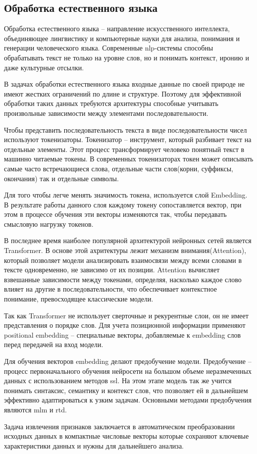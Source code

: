 \documentclass[../part_1.tex]{subfiles}
\begin{document}
\subsection{Обработка естественного языка}
\par Обработка естественного языка -- направление искусственного интеллекта, объединяющее лингвистику и компьютерные науки для анализа, понимания и генерации человеческого языка. Современные \acrshort{nlp}-системы способны обрабатывать текст не только на уровне слов, но и понимать контекст, иронию и даже культурные отсылки.
\par В задачах обработки естественного языка входные данные по своей природе не имеют жестких ограничений по длине и структуре. Поэтому для эффективной обработки таких данных требуются архитектуры способные учитывать произвольные зависимости между элементами последовательности. 
\par Чтобы представить последовательность текста в виде последовательности чисел используют токенизаторы. Токенизатор -- инструмент, который разбивает текст на отдельные элементы. Этот процесс трансформирует человеко понятный текст в машинно читаемые токены. В современных токенизаторах токен может описывать самые часто встречающиеся слова, отдельные части слов(корни, суффиксы, окончания) так и отдельные символы. 
\par Для того чтобы легче менять значимость токена, используется слой Embedding. В результате работы данного слоя каждому токену сопоставляется вектор, при этом в процессе обучения эти векторы изменяются так, чтобы передавать смысловую нагрузку токенов.
\par В последнее время наиболее популярной архитектурой нейронных сетей является Transformer. В основе этой ахритектуры лежит механизм внимания(Attention), который позволяет модели анализировать взаимосвязи между всеми словами в тексте одновременно, не зависимо от их позиции. Attention вычисляет взвешанные зависимости между токенами, определяя, насколько каждое слово влияет на другие в последовательности, что обеспечивает контекстное понимание, превосходящее классические модели.
\par Так как Transformer не использует сверточные и рекурентные слои, он не имеет представления о порядке слов. Для учета позиционной информации применяют positional embedding -- специальные векторы, добавляемые к embedding слов перед передачей на вход модели.
\par Для обучения векторов embedding делают предобучение модели. Предобучение -- процесс первоначального обучения нейросети на большом объеме неразмеченных данных с использованием методов \acrfull{ssl}. На этом этапе модель так же учится понимать синтаксис, семантику и контекст слов, что позволяет ей в дальнейшем эффективно адаптироваться к узким задачам. Основными методами предобучения являются \acrshort{mlm}\cite{sinha2021maskedlanguagemodelingdistributional} и \acrshort{rtd}.
\par Задача извлечения признаков заключается в автоматическом преобразовании исходных данных в компактные числовые векторы которые сохраняют ключевые характеристики данных и нужны для дальнейшего анализа. 
\end{document}
